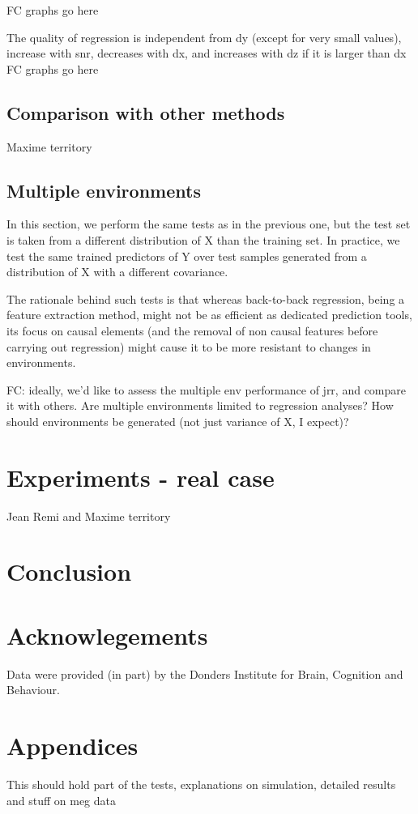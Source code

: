 \documentclass{article}
\begin{document}
FC graphs go here

The quality of regression is independent from dy (except for very small values), increase with snr, decreases with dx, and increases with dz if it is larger than dx
FC graphs go here

\subsection{Comparison with other methods}
Maxime territory

\subsection{Multiple environments}
In this section, we perform the same tests as in the previous one, but the test set is taken from a different distribution of X than the training set.
%
In practice, we test the same trained predictors of Y over test samples generated from a distribution of X with a different covariance.

The rationale behind such tests is that whereas back-to-back regression, being a feature extraction method, might not be as efficient as dedicated prediction tools, its focus on causal elements (and the removal of non causal features before carrying out regression) might cause it to be more resistant to changes in environments.

FC: ideally, we'd like to assess the multiple env performance of jrr, and compare it with others.
%
Are multiple environments limited to regression analyses? How should environments be generated (not just variance of X, I expect)?

\section{Experiments - real case}
Jean Remi and Maxime territory



\section{Conclusion}

\section{Acknowlegements}
Data were provided (in part) by the Donders Institute for Brain, Cognition and Behaviour.

\clearpage
\newpage




\section{Appendices}

This should hold part of the tests, explanations on simulation, detailed results and stuff on meg data
\end{document}
